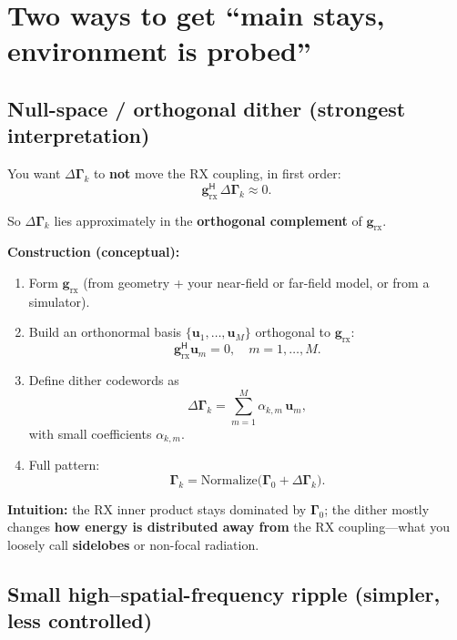 \documentclass[11pt,a4paper]{article}
\newcommand{\rx}{\mathrm{rx}}
\begin{document}
\section{Two ways to get ``main stays, environment is probed''}

\subsection{Null-space / orthogonal dither (strongest interpretation)}

You want $\Delta\bm{\Gamma}_k$ to \textbf{not} move the RX coupling, in first order:
\begin{equation}
\mathbf{g}_{\rx}^{\mathsf{H}}\, \Delta\bm{\Gamma}_k \approx 0.
\end{equation}

So $\Delta\bm{\Gamma}_k$ lies approximately in the \textbf{orthogonal complement} of $\mathbf{g}_{\rx}$.

\textbf{Construction (conceptual):}
\begin{enumerate}
\item Form $\mathbf{g}_{\rx}$ (from geometry + your near-field or far-field model, or from a simulator).
\item Build an orthonormal basis $\{\mathbf{u}_1, \ldots, \mathbf{u}_M\}$ orthogonal to $\mathbf{g}_{\rx}$:
\begin{equation}
\mathbf{g}_{\rx}^{\mathsf{H}} \mathbf{u}_m = 0, \quad m = 1,\ldots,M.
\end{equation}
\item Define dither codewords as
\begin{equation}
\Delta\bm{\Gamma}_k = \sum_{m=1}^{M} \alpha_{k,m}\, \mathbf{u}_m,
\end{equation}
with small coefficients $\alpha_{k,m}$.
\item Full pattern:
\begin{equation}
\bm{\Gamma}_k = \mathrm{Normalize}\bigl(\bm{\Gamma}_0 + \Delta\bm{\Gamma}_k\bigr).
\end{equation}
\end{enumerate}

\textbf{Intuition:} the RX inner product stays dominated by $\bm{\Gamma}_0$; the dither mostly changes \textbf{how energy is distributed away from} the RX coupling---what you loosely call \textbf{sidelobes} or non-focal radiation.

\subsection{Small high--spatial-frequency ripple (simpler, less controlled)}
\end{document}
